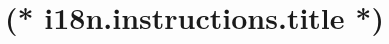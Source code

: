 \documentclass[12pt, twoside]{article}
\begin{document}
    \pagestyle{instructions}
    \section{(* i18n.instructions.title *)}
    
\end{document}
